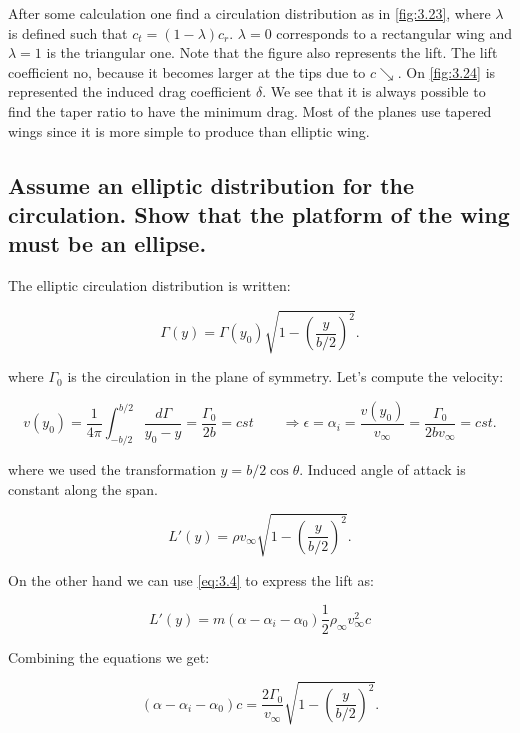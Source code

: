 \documentclass[british,french,11pt, a4paper, openany]{article}
\begin{document}
After some calculation one find a circulation distribution as in \autoref{fig:3.23}, where $\lambda$ is defined such that $c_t = (1- \lambda) c_r$. $\lambda = 0$ corresponds to a rectangular wing and $\lambda = 1$ is the triangular one. Note that the figure also represents the lift. The lift coefficient no, because it becomes larger at the tips due to $c\searrow$. On \autoref{fig:3.24} is represented the induced drag coefficient $\delta$. We see that it is always possible to find the taper ratio to have the minimum drag. Most of the planes use tapered wings since it is more simple to produce than elliptic wing.

\subsection{Assume an elliptic distribution for the circulation. Show that the platform of the wing must be an ellipse.}

The elliptic circulation distribution is written:

\begin{equation}
\Gamma (y) = \Gamma (y_0) \sqrt{1-\left( \frac{y}{b/2} \right)^2}.
\end{equation}

where $\Gamma _0$ is the circulation in the plane of symmetry. Let's compute the velocity:

\begin{equation}
v(y_0) = \frac{1}{4\pi} \int _{-b/2}^{b/2} \frac{d\Gamma }{y_0 - y} = \frac{\Gamma _0}{2b} = cst \qquad \Rightarrow \epsilon = \alpha _i = \frac{v(y_0)}{v_\infty} = \frac{\Gamma _0}{2b v_\infty} = cst.
\end{equation}

where we used the transformation $y = b/2 \cos \theta$. Induced angle of attack is constant along the span.

\begin{equation}
L'(y) = \rho v_\infty \sqrt{1-\left( \frac{y}{b/2} \right)^2}.
\end{equation}

On the other hand we can use \eqref{eq:3.4} to express the lift as: 

\begin{equation}
L'(y) = m (\alpha - \alpha _i - \alpha _0) \frac{1}{2} \rho _\infty v_\infty ^2 c
\end{equation}

Combining the equations we get: 

\begin{equation}
(\alpha - \alpha _i - \alpha _0) c = \frac{2\Gamma _0}{v_\infty} \sqrt{1-\left( \frac{y}{b/2}\right)^2}. 
\end{equation}
\end{document}
